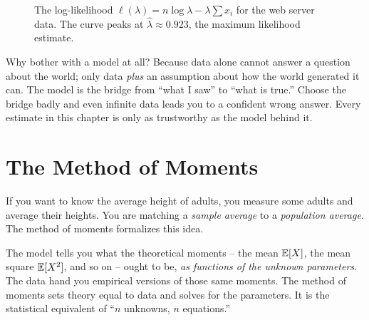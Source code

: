 \begin{figure}[H]
\centering
{}
\caption{The log-likelihood $\ell(\lambda) = n\log\lambda - \lambda\sum x_i$ for the web server data. The curve peaks at $\hat\lambda \approx 0.923$, the maximum likelihood estimate.}
\label{ch30:fig-worked-expo}
\end{figure}

\begin{aestheticbox}
Why bother with a model at all? Because data alone cannot answer a question
about the world; only data \emph{plus} an assumption about how the world
generated it can. The model is the bridge from ``what I saw'' to ``what is
true.'' Choose the bridge badly and even infinite data leads you to a confident
wrong answer. Every estimate in this chapter is only as trustworthy as the model
behind it.
\end{aestheticbox}

\section{The Method of Moments}
\label{ch30:mom}

If you want to know the average height of adults, you measure some adults and average their heights. You are matching a \emph{sample average} to a \emph{population average}. The method of moments formalizes this idea.

\begin{intuitionbox}
The model tells you what the theoretical moments -- the mean $\operatorname{\mathbb{E}}[X]$, the mean
square $\operatorname{\mathbb{E}}[X^2]$, and so on -- ought to be, \emph{as functions of the unknown
parameters}. The data hand you empirical versions of those same moments. The
method of moments sets theory equal to data and solves for the parameters. It
is the statistical equivalent of ``$n$ unknowns, $n$ equations.''
\end{intuitionbox}

